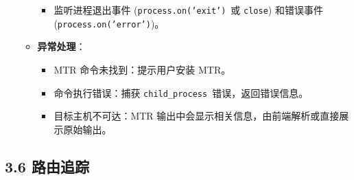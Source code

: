 \documentclass{article}
\begin{document}
\begin{itemize}
\begin{itemize}
\begin{itemize}
            \item 监听进程退出事件 (\texttt{process.on('exit')}\ 或 \texttt{close}) 和错误事件 (\texttt{process.on('error')})。
        \end{itemize}
        \item \textbf{异常处理}：
        \begin{itemize}
            \item MTR 命令未找到：提示用户安装 MTR。
            \item 命令执行错误：捕获 \texttt{child\_process}\ 错误，返回错误信息。
            \item 目标主机不可达：MTR 输出中会显示相关信息，由前端解析或直接展示原始输出。
        \end{itemize}
    \end{itemize}
\end{itemize}

\subsection*{3.6 路由追踪}
\end{document}
